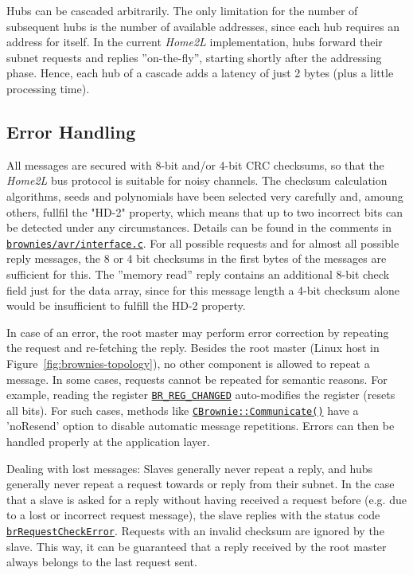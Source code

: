 \documentclass[12pt,english,parskip=half,headheight=19pt]{scrreprt}
\newcommand{\refsrc}[1]{\href{#1}{\texttt{#1}}}     %
\newcommand{\refapic}[1]{\href{home2l-api_c/index.html}{\mbox{\texttt{#1}}}}            %
\begin{document}
Hubs can be cascaded arbitrarily. The only limitation for the number of subsequent hubs is the number of available addresses, since each hub requires an address for itself. In the current \textit{Home2L} implementation, hubs forward their subnet requests and replies ''on-the-fly'', starting shortly after the addressing phase. Hence, each hub of a cascade adds a latency of just 2 bytes (plus a little processing time).



\subsection{Error Handling}
\label{sec:brownies-bus-errors}

All messages are secured with 8-bit and/or 4-bit CRC checksums, so that the \textit{Home2L} bus protocol is suitable for noisy channels. The checksum calculation algorithms, seeds and polynomials have been selected very carefully and, amoung others, fullfil the "HD-2" property, which means that up to two incorrect bits can be detected under any circumstances. Details can be found in the comments in \refsrc{brownies/avr/interface.c}.
For all possible requests and for almost all possible reply messages, the 8 or 4 bit checksums in the first bytes of the messages are sufficient for this. The ''memory read'' reply contains an additional 8-bit check field just for the data array, since for this message length a 4-bit checksum alone would be insufficient to fulfill the HD-2 property.

In case of an error, the root master may perform error correction by repeating the request and re-fetching the reply. Besides the root master (Linux host in Figure~\ref{fig:brownies-topology}), no other component is allowed to repeat a message. In some cases, requests cannot be repeated for semantic reasons. For example, reading the register \refapic{BR\_REG\_CHANGED} auto-modifies the register (resets all bits). For such cases, methods like \refapic{CBrownie::Communicate()} have a 'noResend' option to disable automatic message repetitions. Errors can then be handled properly at the application layer.

Dealing with lost messages: Slaves generally never repeat a reply, and hubs generally never repeat a request towards or reply from their subnet. In the case that a slave is asked for a reply without having received a request before (e.g. due to a lost or incorrect request message), the slave replies with the status code \refapic{brRequestCheckError}. Requests with an invalid checksum are ignored by the slave. This way, it can be guaranteed that a reply received by the root master always belongs to the last request sent.
\end{document}

